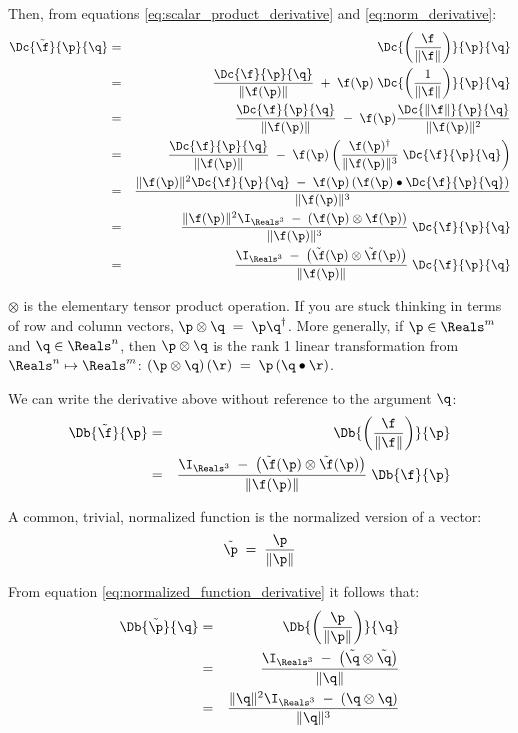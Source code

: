 Then, from equations \ref{eq:scalar_product_derivative}
and \ref{eq:norm_derivative}:
\begin{eqnarray}
\Dc{\tilde{\f}}{\p}{\q}
& = &
\Dc{\left({\f \over {\| \f \|}}\right)}{\p}{\q}
\\
& = &
{\Dc{\f}{\p}{\q} \over {\| \f(\p) \|}}
\; + \;
\f(\p) \; \Dc{\left({1 \over {\| \f \|}}\right)}{\p}{\q} \nonumber \\
& = &
{\Dc{\f}{\p}{\q} \over {\| \f(\p) \|}}
\; - \;
\f(\p) {{\Dc{\| \f \|}{\p}{\q}} \over {\|\f(\p)\|^2}} \nonumber \\
& = &
{\Dc{\f}{\p}{\q} \over {\| \f(\p) \|}}
\; - \;
\f(\p) \left( {{\f(\p)^\dagger} \over {\| \f(\p) \|^3}} \;\Dc{\f}{\p}{\q} \right) \nonumber \\
& = &
{\| \f(\p) \|^2 \Dc{\f}{\p}{\q}
\; - \;
\f(\p)\left( \f(\p) \bullet \Dc{\f}{\p}{\q} \right) }
\over {\| \f(\p) \|^3}  \nonumber \\
& = &
{{\| \f(\p) \|^2 \I_{\Reals^3} \;- \;\left( \f(\p) \otimes \f(\p) \right)  }
\over {\| \f(\p) \|^3} }
\;\Dc{\f}{\p}{\q} \nonumber \\
& = &
{{\I_{\Reals^3} \;- \;\left( \tilde{\f}(\p) \otimes \tilde{\f}(\p) \right)  }
\over {\| \f(\p) \|} }
\;\Dc{\f}{\p}{\q} \nonumber
\end{eqnarray}

$\otimes$ is the elementary tensor product operation.
If you are stuck thinking in terms of row and column vectors,
$\p \otimes \q \;= \;\p\q^\dagger$.
More generally, if $\p \in \Reals^m$ and $\q \in \Reals^n$,
then $\p \otimes \q$ is the rank 1 linear transformation from $\Reals^n \mapsto \Reals^m$:
$\left(\p \otimes \q\right) (\r) \;= \;\p \left(\q \bullet \r\right)$.

We can write the derivative above without reference to the argument $\q$:
\begin{eqnarray}
\label{eq:normalized_function_derivative}
\Db{\tilde{\f}}{\p}
& = &
\Db{\left({\f \over {\| \f \|}}\right)}{\p}  \\
& = &
{{\I_{\Reals^3} \;- \;\left( \tilde{\f}(\p) \otimes \tilde{\f}(\p) \right) }
\over {\| \f(\p) \|} }
\;\Db{\f}{\p} \nonumber
\end{eqnarray}

A common, trivial, normalized function is the normalized version of
a vector:
\begin{equation}
\tilde{\p} \;= \;{{\p} \over {\| \p \|}}
\end{equation}

From equation \ref{eq:normalized_function_derivative}
it follows that:
\begin{eqnarray}
\label{eq:normalized_vector_derivative}
\Db{\tilde{\p}}{\q}
& = &
\Db{\left({\p \over {\| \p \|}}\right)}{\q}
\\
& = &
{{\I_{\Reals^3} \;- \;\left( \tilde{\q} \otimes \tilde{\q} \right) }
\over {\| \q \|} }
\nonumber
\\
& = &
{{\| \q \|^2 \I_{\Reals^3} \;- \;\left( \q \otimes \q \right) }
\over {\| \q \|^3} }
\nonumber
\end{eqnarray}

